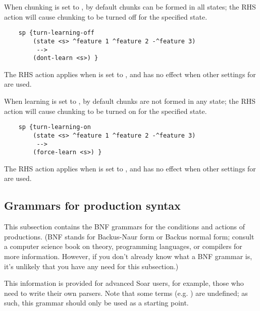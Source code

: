 \begin{description}
	
\item [\soarb{dont-learn} --- ] 
	When chunking is set to , by default chunks can be formed in all states; the  RHS action will cause chunking to be turned off for the specified state.

	\begin{verbatim}
	sp {turn-learning-off
	    (state <s> ^feature 1 ^feature 2 -^feature 3)
	     -->
	    (dont-learn <s>) }
	\end{verbatim}

	The  RHS action applies when  is set to , and has no effect when other settings for  are used.


\item [\soarb{force-learn} --- ] 
	When learning is set to , by default chunks are not formed in any state; the  RHS action will cause chunking to be turned on for the specified state.

	\begin{verbatim}
	sp {turn-learning-on
	    (state <s> ^feature 1 ^feature 2 -^feature 3)
	     -->
	    (force-learn <s>) }
	\end{verbatim}

	The  RHS action applies when  is set to , and has no effect when other settings for  are used.

\end{description}

\subsection{Grammars for production syntax} %
\label{GRAMMARS}

This subsection contains the BNF grammars for the conditions and actions of productions. (BNF stands for Backus-Naur form or Backus normal form; consult a computer science book on theory, programming languages, or compilers for more information. However, if you don't already know what a BNF grammar is, it's unlikely that you have any need for this subsection.)

This information is provided for advanced Soar users, for example, those who need to write their own parsers. Note that some terms (e.g. ) are undefined; as such, this grammar should only be used as a starting point.

